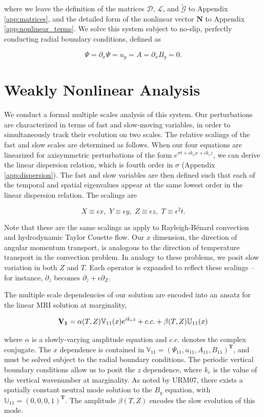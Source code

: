 \documentclass{emulateapj}
\newcommand{\beq}{\begin{equation}}
\newcommand{\eeq}{\end{equation}}
\begin{document}
where we leave the definition of the matrices $\mathcal{D}$, $\mathcal{L}$, and $\widetilde{\mathcal{G}}$ to Appendix \ref{app:matrices}, and the detailed form of the nonlinear vector $\mathbf{N}$ to Appendix \ref{app:nonlinear_terms}. We solve this system subject to no-slip, perfectly conducting radial boundary conditions, defined as

\beq
\Psi = \partial_x \Psi = u_y = A = \partial_x B_y = 0.
\eeq


\section{Weakly Nonlinear Analysis}

We conduct a formal multiple scales analysis of this system. Our perturbations are characterized in terms of fast and slow-moving variables, in order to simultaneously track their evolution on two scales. The relative scalings of the fast and slow scales are determined as follows. When our four equations are linearized for axisymmetric perturbations of the form $e^{\sigma t + i k_x x + i k_z z}$, we can derive the linear dispersion relation, which is fourth order in $\sigma$ (Appendix \ref{app:dispersion}). The fast and slow variables are then defined such that each of the temporal and spatial eigenvalues appear at the same lowest order in the linear dispersion relation. The scalings are

\beq\label{scalings}
X \equiv \epsilon x,  \, \, Y \equiv \epsilon y, \, \, Z \equiv \epsilon z, \, \, T \equiv \epsilon^2 t.
\eeq

Note that these are the same scalings as apply to Rayleigh-B\'enard convection and hydrodynamic Taylor Couette flow. Our $x$ dimension, the direction of angular momentum transport, is analogous to the direction of temperature transport in the convection problem. In analogy to these problems, we posit slow variation in both $Z$ and $T$. Each operator is expanded to reflect these scalings -- for instance, $\partial_z$ becomes $\partial_z + \epsilon\partial_Z$. 

The multiple scale dependencies of our solution are encoded into an ansatz for the linear MRI solution at marginality,

\beq
\label{V1_ansatz}
\mathbf{V_1} = \alpha(T, Z) \mathbb{V}_{11}(x) e^{i k_c z} + c.c. + \beta(T, Z)\mathbb{U}_{11}(x)\\
\eeq

where $\alpha$ is a slowly-varying amplitude equation and $c.c.$ denotes the complex conjugate. The $x$ dependence is contained in $\mathbb{V}_{11} = (\Psi_{11}, u_{11}, A_{11}, B_{11})^\mathbf{T}$, and must be solved subject to the radial boundary conditions. The periodic vertical boundary conditions allow us to posit the $z$ dependence, where $k_c$ is the value of the vertical wavenumber at marginality. As noted by URM07, there exists a spatially constant neutral mode solution to the $B_y$ equation, with $\mathbb{U}_{11} = (0, 0, 0, 1)^\mathbf{T}$. The amplitude $\beta(T, Z)$ encodes the slow evolution of this mode.
\end{document}
